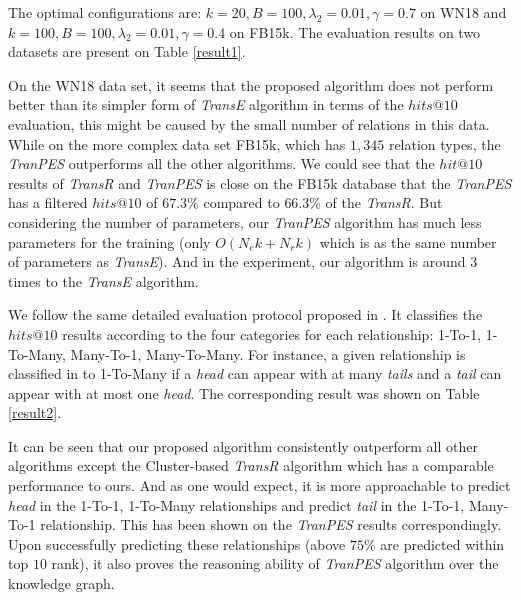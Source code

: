 \documentclass[9pt]{sig-alternate-05-2015}
\begin{document}
The optimal configurations are: $k=20, B = 100, \lambda_2=0.01, \gamma=0.7$ on WN18 and $k=100, B=100, \lambda_2 = 0.01, \gamma=0.4$ on FB15k. The evaluation results on two datasets are present on Table \ref{result1}.

On the WN18 data set, it seems that the proposed algorithm does not perform better than its simpler form of \emph{TransE} algorithm in terms of the $hits@10$ evaluation, this might be caused by the small number of relations in this data. While on the more complex data set FB15k, which has $1,345$  relation types, the \emph{TranPES} outperforms all the other algorithms.  We could see that the $hit@10$ results of \emph{TransR} and \emph{TranPES} is close on the FB15k database that the \emph{TranPES} has a filtered $hits@10$ of $67.3\%$ compared to $66.3\%$ of the \emph{TransR}.   But  considering the number of parameters, our \emph{TranPES} algorithm has much less parameters for the training (only $O(N_ek+N_rk)$ which is as the same number of parameters as \emph{TransE}). And in the experiment, our algorithm is around 3 times to the \emph{TransE} algorithm.

We follow the same detailed evaluation protocol proposed in \cite{bordes_translating_2013}. It classifies the $hits@10$ results according to the four categories for each relationship:  1-To-1, 1-To-Many, Many-To-1, Many-To-Many. For instance, a given relationship is classified in to 1-To-Many if a \emph{head} can appear with at many \emph{tails} and a \emph{tail} can appear with at most one \emph{head}.  The corresponding result was shown on Table \ref{result2}. 

It can be seen that our proposed algorithm consistently outperform all other algorithms except the Cluster-based \emph{TransR} algorithm which has a comparable performance to ours.  And as one would expect, it is more approachable to predict \emph{head} in the 1-To-1, 1-To-Many  relationships and predict \emph{tail} in the 1-To-1, Many-To-1 relationship. This has been shown on the \emph{TranPES} results correspondingly. Upon successfully predicting these relationships (above $75\%$ are predicted within top $10$ rank), it also proves the reasoning ability of \emph{TranPES} algorithm over the knowledge graph.
\end{document}
